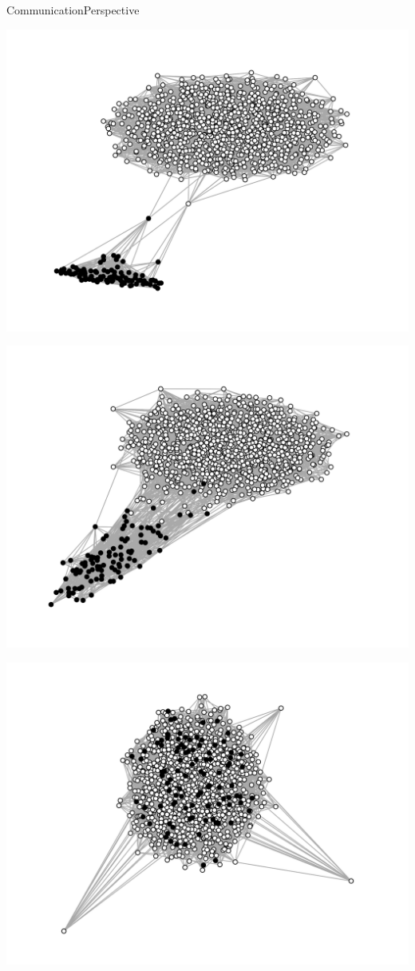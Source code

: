 \begin{frame}{Communication}{Perspective}
  \begin{minipage}{0.325\textwidth}
    \includegraphics[width=1.2\textwidth]{img/graphA.png}
  \end{minipage}
  \begin{minipage}{0.325\textwidth}
    \includegraphics[width=1.2\textwidth]{img/graphB.png}
  \end{minipage}
  \begin{minipage}{0.325\textwidth}
    \includegraphics[width=1.2\textwidth]{img/graphC.png}

\end{minipage}
\end{frame}
